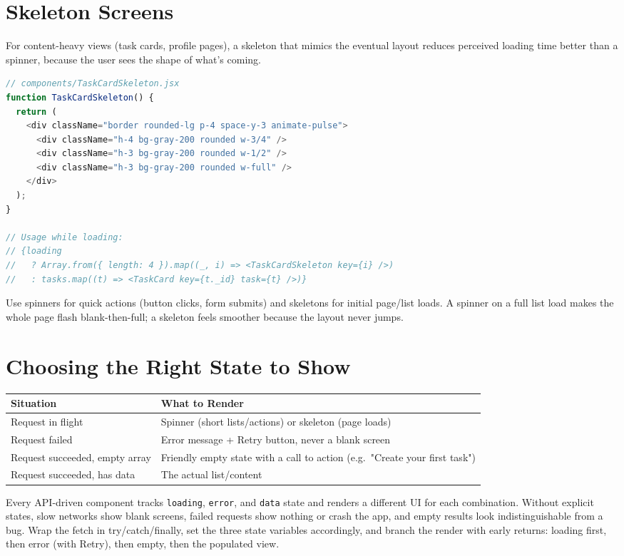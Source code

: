 \section{Skeleton Screens}

For content-heavy views (task cards, profile pages), a skeleton that mimics
the eventual layout reduces perceived loading time better than a spinner,
because the user sees the shape of what's coming.

\begin{lstlisting}[language=JavaScript]
// components/TaskCardSkeleton.jsx
function TaskCardSkeleton() {
  return (
    <div className="border rounded-lg p-4 space-y-3 animate-pulse">
      <div className="h-4 bg-gray-200 rounded w-3/4" />
      <div className="h-3 bg-gray-200 rounded w-1/2" />
      <div className="h-3 bg-gray-200 rounded w-full" />
    </div>
  );
}

// Usage while loading:
// {loading
//   ? Array.from({ length: 4 }).map((_, i) => <TaskCardSkeleton key={i} />)
//   : tasks.map((t) => <TaskCard key={t._id} task={t} />)}
\end{lstlisting}

\begin{tipbox}[TIP]
Use spinners for quick actions (button clicks, form submits) and skeletons
for initial page/list loads. A spinner on a full list load makes the whole
page flash blank-then-full; a skeleton feels smoother because the layout
never jumps.
\end{tipbox}

\section{Choosing the Right State to Show}

\begin{center}
\begin{tabularx}{\textwidth}{lX}
\toprule
\textbf{Situation} & \textbf{What to Render} \\
\midrule
Request in flight & Spinner (short lists/actions) or skeleton (page loads) \\
Request failed & Error message + Retry button, never a blank screen \\
Request succeeded, empty array & Friendly empty state with a call to action (e.g.\ "Create your first task") \\
Request succeeded, has data & The actual list/content \\
\bottomrule
\end{tabularx}
\end{center}

\whatwhyhow
{Every API-driven component tracks \texttt{loading}, \texttt{error}, and \texttt{data} state and renders a different UI for each combination.}
{Without explicit states, slow networks show blank screens, failed requests show nothing or crash the app, and empty results look indistinguishable from a bug.}
{Wrap the fetch in try/catch/finally, set the three state variables accordingly, and branch the render with early returns: loading first, then error (with Retry), then empty, then the populated view.}
